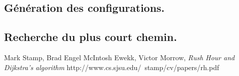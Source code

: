 \documentclass[10pt, a4paper]{article}
\begin{document}

\subsection{Génération des configurations.}
\subsection{Recherche du plus court chemin.}

\begin{thebibliography}
    Mark Stamp, Brad Engel McIntosh Ewekk, Victor Morrow,
    \emph{Rush Hour and Dijkstra's algorithm}
    http://www.cs.sjsu.edu/~stamp/cv/papers/rh.pdf

\end{thebibliography}
\end{document}
